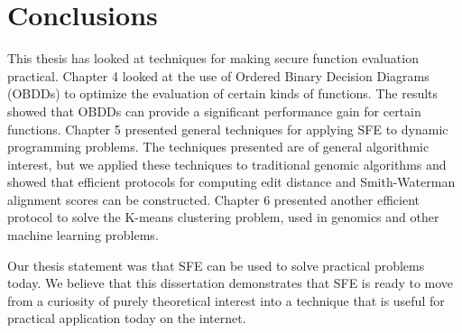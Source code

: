 \chapter{Conclusions}
This thesis has looked at techniques for making secure function
evaluation practical. Chapter 4 looked at the use of Ordered
Binary Decision Diagrams (OBDDs) to optimize the evaluation of certain
kinds of functions. The results showed that OBDDs can provide a
significant performance gain for certain functions.
Chapter 5 presented general techniques for applying
SFE to dynamic programming problems. The techniques presented are
of general algorithmic interest, but we applied these techniques to
traditional genomic algorithms and showed that efficient protocols
for computing edit distance and Smith-Waterman alignment scores can
be constructed. Chapter 6 presented another efficient protocol to
solve the K-means clustering problem, used in genomics and other machine
learning problems. 

Our thesis statement was that SFE can be used to solve practical problems
today. We believe that this dissertation demonstrates that
SFE is ready to move from a curiosity of purely theoretical interest
into a technique that is useful for practical application today on
the internet.
